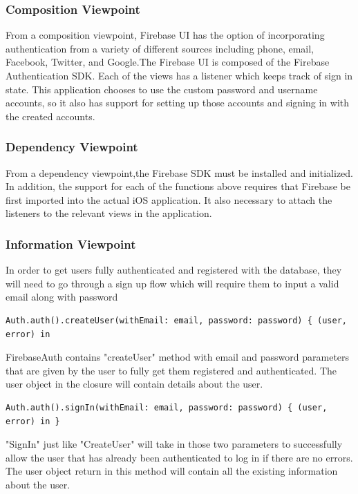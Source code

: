 \documentclass[onecolumn, draftclsnofoot,10pt, compsoc]{IEEEtran}
\begin{document}
\subsubsection{Composition Viewpoint}
From a composition viewpoint, Firebase UI has the option of incorporating authentication from a variety of different sources including phone, email, Facebook, Twitter, and Google.The Firebase UI is composed of the Firebase Authentication SDK. Each of the views has a listener which keeps track of sign in state.   This application chooses to use the custom password and username accounts, so it also has support for setting up those accounts and signing in with the created accounts.
\subsubsection{Dependency Viewpoint}
From a dependency viewpoint,the Firebase SDK must be installed and initialized. In addition, the support for each of the functions above requires that Firebase be first imported into the actual iOS application. It also necessary to attach the listeners to the relevant views in the application. 
\subsubsection{Information Viewpoint}
In order to get users fully authenticated and registered with the database, they will need to go through a sign up flow which will require them to input a valid email along with password 

\begin{verbatim}
Auth.auth().createUser(withEmail: email, password: password) { (user, error) in
\end{verbatim}
FirebaseAuth contains "createUser" method with email and password parameters that are given by the user to fully get them registered and authenticated. The user object in the closure will contain details about the user. 

\begin{verbatim}
Auth.auth().signIn(withEmail: email, password: password) { (user, error) in }
\end{verbatim}

\noindent "SignIn" just like "CreateUser" will take in those two parameters to successfully allow the user that has already been authenticated to log in if there are no errors. The user object return in this method will contain all the existing information about the user.
\end{document}
